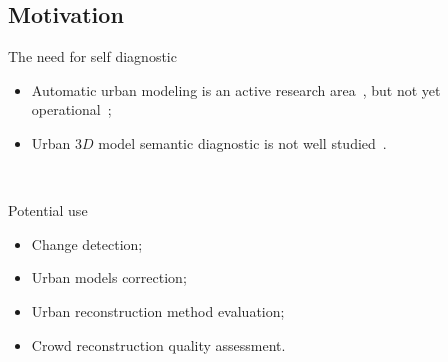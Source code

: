\documentclass{beamer}
\begin{document}
        \subsection{Motivation}
            \begin{frame}{The need for self diagnostic}
                \begin{itemize}[label=$\blacktriangleright$, font=\color{IGNGreen}]
                    \item<1-> Automatic urban modeling is an active research area~\cite{Musialski2012}, but not \textcolor{IGNRed}{yet operational}~\cite{rottensteiner2014results};
                    \item<2-> Urban $3D$ model semantic diagnostic is not well studied~\cite{nguatem2017modeling}.
                \end{itemize}
                ~\\
            \end{frame}

            \begin{frame}{Potential use}
                \begin{itemize}[label=$\blacktriangleright$, font=\color{IGNGreen}]
                    \item<1-> Change detection;
                    \item<2-> Urban models correction;
                    \item<3-> Urban reconstruction method evaluation;
                    \item<4-> Crowd reconstruction quality assessment.
                \end{itemize}
            \end{frame}
\end{document}
